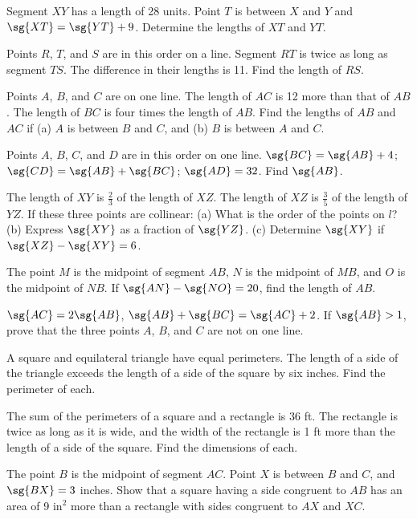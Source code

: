 \documentclass[11pt]{book}
\theoremstyle{bkplain}
\theoremstyle{XIplainnote}
\theoremstyle{bkplain}
\theoremstyle{bkplain}
\begin{document}
\begin{exercisecols}
\begin{exlist}
\item Segment $XY$ has a length of 28 units. Point $T$ is between $X$ and $Y$
      and $\sg{XT} = \sg{YT} + 9$. Determine the lengths of $XT$ and $YT$.
\item Points $R$, $T$, and $S$ are in this order on a line. Segment $RT$ is
      twice as long as segment $TS$. The difference in their lengths is 11.
      Find the length of $RS$.
\item Points $A$, $B$, and $C$ are on one line. The length of $AC$ is 12 more
      than that of $AB$. The length of $BC$ is four times the length of $AB$.
      Find the lengths of $AB$ and $AC$ if (a) $A$ is between $B$ and $C$, and
      (b) $B$ is between $A$ and $C$.
\item Points $A$, $B$, $C$, and $D$ are in this order on one line.
      $\sg{BC} = \sg{AB} + 4$; $\sg{CD} = \sg{AB} + \sg{BC}$; $\sg{AD} = 32$.
      Find $\sg{AB}$.
\item The length of $XY$ is $\frac{2}{3}$ of the length of $XZ$. The length of
      $XZ$ is $\frac{3}{5}$ of the length of $YZ$. If these three points are
      collinear: (a) What is the order of the points on $l$? (b) Express
      $\sg{XY}$ as a fraction of $\sg{YZ}$. (c) Determine $\sg{XY}$ if
      $\sg{XZ} - \sg{XY} = 6$.
\item The point $M$ is the midpoint of segment $AB$, $N$ is the midpoint of
      $MB$, and $O$ is the midpoint of $NB$. If $\sg{AN} - \sg{NO} = 20$, find
      the length of $AB$.
\item $\sg{AC} = 2\sg{AB}$, $\sg{AB} + \sg{BC} = \sg{AC} + 2$. If
      $\sg{AB} > 1$, prove that the three points $A$, $B$, and $C$ are not on
      one line.
\item A square and equilateral triangle have equal perimeters. The length of a
      side of the triangle exceeds the length of a side of the square by six
      inches. Find the perimeter of each.
\item The sum of the perimeters of a square and a rectangle is 36 ft. The
      rectangle is twice as long as it is wide, and the width of the rectangle
      is 1 ft more than the length of a side of the square. Find the dimensions
      of each.
\item The point $B$ is the midpoint of segment $AC$. Point $X$ is between $B$
      and $C$, and $\sg{BX} = 3$ inches. Show that a square having a side
      congruent to $AB$ has an area of 9 in$^2$ more than a rectangle with
      sides congruent to $AX$ and $XC$.
\end{exlist}
\end{exercisecols}
\clearpage
\setcounter{theorem}{0}\setcounter{definition}{0}\setcounter{construction}{0}\setcounter{exgroup}{0}\setcounter{footnote}{0}
\setcounter{chapter}{6}
\end{document}
